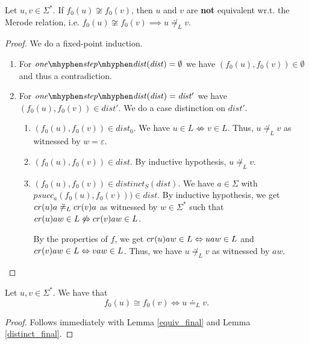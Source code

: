 \begin{lemma}
    \label{distinct_final}
    Let $u,v \in \Sigma^*$. 
    If ${f_0}(u) \not\cong {f_0}(v)$, then $u$ and $v$ are \textbf{not} equivalent wr.t. the Merode relation, i.e. ${f_0}(u) \not\cong {f_0}(v) \implies u \not\doteq_L v$.
\end{lemma}
\begin{proof}
    We do a fixed-point induction.
    \begin{enumerate}
        \item For $\mathit{one\mhyphen step\mhyphen dist}(\mathit{dist}) = \emptyset$ we have $({f_0}(u), {f_0}(v)) \in \emptyset$ and thus a contradiction. 
        \item For $\mathit{one\mhyphen step\mhyphen dist}(\mathit{dist}) = \mathit{dist'}$ we have $({f_0}(u), {f_0}(v)) \in \mathit{dist'}$. 
            We do a case distinction on $\mathit{dist'}$.
            \begin{enumerate}
                \item $({f_0}(u), {f_0}(v)) \in \mathit{dist_0}$.
                    We have $u \in L \not\Leftrightarrow v \in L$. 
                    Thus, $u \not\doteq_L v$ as witnessed by $w=\varepsilon$.
                \item $({f_0}(u), {f_0}(v)) \in \mathit{dist}$. 
                    By inductive hypothesis, $u \not\doteq_L v$.
                \item $({f_0}(u), {f_0}(v)) \in \mathit{distinct_S}(\mathit{dist})$.
                    We have $a \in \Sigma$ with $\mathit{psucc_a}({f_0}(u), {f_0}(v))) \in \mathit{dist}$.
                    By inductive hypothesis, we get $cr(u)a \not\doteq_L cr(v)a$ 
                    as witnessed by $w \in \Sigma^*$ 
                    such that $cr(u)aw \in L \not\Leftrightarrow cr(v)aw \in L$.

                    By the properties of $f$, we get $cr(u)aw \in L \Leftrightarrow uaw \in L$ and $cr(v)aw \in L \Leftrightarrow vaw \in L$.
                    Thus, we have $u \not\doteq_L v$ as witnessed by $aw$.
            \end{enumerate}
    \end{enumerate}
\end{proof}


\begin{corollary}
    \label{equivP}
    Let $u, v \in \Sigma^*$. We have that
    \begin{equation*}
        {f_0}(u) \cong {f_0}(v) \iff u \doteq_L v.
    \end{equation*}
\end{corollary}
\begin{proof}
    Follows immediately with Lemma \ref{equiv_final} and Lemma \ref{distinct_final}. 
\end{proof}

